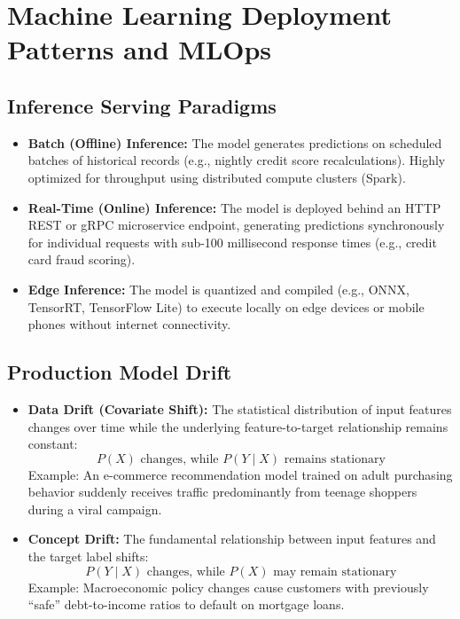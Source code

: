 \section{Machine Learning Deployment Patterns and MLOps}
\label{sec:mlops_deployment}

\subsection{Inference Serving Paradigms}
\begin{itemize}
    \item \textbf{Batch (Offline) Inference:} The model generates predictions on scheduled batches of historical records (e.g., nightly credit score recalculations). Highly optimized for throughput using distributed compute clusters (Spark).
    \item \textbf{Real-Time (Online) Inference:} The model is deployed behind an HTTP REST or gRPC microservice endpoint, generating predictions synchronously for individual requests with sub-100 millisecond response times (e.g., credit card fraud scoring).
    \item \textbf{Edge Inference:} The model is quantized and compiled (e.g., ONNX, TensorRT, TensorFlow Lite) to execute locally on edge devices or mobile phones without internet connectivity.
\end{itemize}

\subsection{Production Model Drift}
\begin{itemize}
    \item \textbf{Data Drift (Covariate Shift):} The statistical distribution of input features changes over time while the underlying feature-to-target relationship remains constant:
    \begin{equation}
    P(X) \text{ changes, while } P(Y \mid X) \text{ remains stationary}
    \end{equation}
    Example: An e-commerce recommendation model trained on adult purchasing behavior suddenly receives traffic predominantly from teenage shoppers during a viral campaign.
    \item \textbf{Concept Drift:} The fundamental relationship between input features and the target label shifts:
    \begin{equation}
    P(Y \mid X) \text{ changes, while } P(X) \text{ may remain stationary}
    \end{equation}
    Example: Macroeconomic policy changes cause customers with previously ``safe'' debt-to-income ratios to default on mortgage loans.
\end{itemize}

